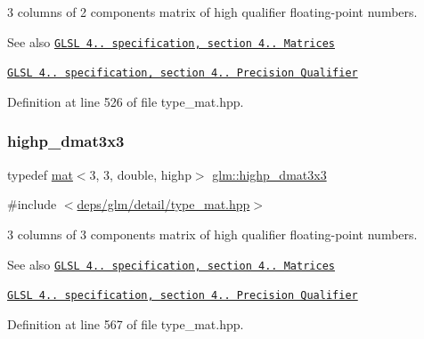3 columns of 2 components matrix of high qualifier floating-\/point numbers.

\begin{DoxySeeAlso}{See also}
\href{http://www.opengl.org/registry/doc/GLSLangSpec.4.20.8.pdf}{\tt G\+L\+SL 4.. specification, section 4.. Matrices} 

\href{http://www.opengl.org/registry/doc/GLSLangSpec.4.20.8.pdf}{\tt G\+L\+SL 4.. specification, section 4.. Precision Qualifier} 
\end{DoxySeeAlso}


Definition at line 526 of file type\+\_\+mat.\+hpp.

\mbox{\label{group__core__precision_gae5f677e4437523476511c84a17206ac2}} 
\subsubsection{\texorpdfstring{highp\+\_\+dmat3x3}{highp\_dmat3x3}}
{\footnotesize\ttfamily typedef \hyperlink{structglm_1_1mat}{mat}$<$3, 3, double, highp$>$ \hyperlink{group__core__precision_gae5f677e4437523476511c84a17206ac2}{glm\+::highp\+\_\+dmat3x3}}



{\ttfamily \#include $<$\hyperlink{type__mat_8hpp}{deps/glm/detail/type\+\_\+mat.\+hpp}$>$}

3 columns of 3 components matrix of high qualifier floating-\/point numbers.

\begin{DoxySeeAlso}{See also}
\href{http://www.opengl.org/registry/doc/GLSLangSpec.4.20.8.pdf}{\tt G\+L\+SL 4.. specification, section 4.. Matrices} 

\href{http://www.opengl.org/registry/doc/GLSLangSpec.4.20.8.pdf}{\tt G\+L\+SL 4.. specification, section 4.. Precision Qualifier} 
\end{DoxySeeAlso}


Definition at line 567 of file type\+\_\+mat.\+hpp.

\mbox{\label{group__core__precision_ga21d3883c59ff3949404de6713e86c89e}} 
